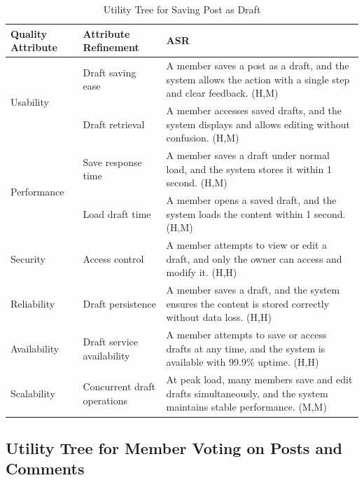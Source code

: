 \documentclass{article}
\begin{document}
\begin{table}[H]
\centering
\caption{Utility Tree for Saving Post as Draft}
\begin{tabular}{|p{3cm}|p{4cm}|p{7cm}|}
\hline
\textbf{Quality Attribute} & \textbf{Attribute Refinement} & \textbf{ASR} \\
\hline

\multirow{2}{*}{Usability}
& Draft saving ease
& A member saves a post as a draft, and the system allows the action with a single step and clear feedback. (H,M) \\
\cline{2-3}
& Draft retrieval
& A member accesses saved drafts, and the system displays and allows editing without confusion. (H,M) \\
\hline

\multirow{2}{*}{Performance}
& Save response time
& A member saves a draft under normal load, and the system stores it within 1 second. (H,M) \\
\cline{2-3}
& Load draft time
& A member opens a saved draft, and the system loads the content within 1 second. (H,M) \\
\hline

Security
& Access control
& A member attempts to view or edit a draft, and only the owner can access and modify it. (H,H) \\
\hline

Reliability
& Draft persistence
& A member saves a draft, and the system ensures the content is stored correctly without data loss. (H,H) \\
\hline

Availability
& Draft service availability
& A member attempts to save or access drafts at any time, and the system is available with 99.9\% uptime. (H,H) \\
\hline

Scalability
& Concurrent draft operations
& At peak load, many members save and edit drafts simultaneously, and the system maintains stable performance. (M,M) \\
\hline

\end{tabular}
\end{table}

\subsection{Utility Tree for Member Voting on Posts and Comments}
\end{document}
